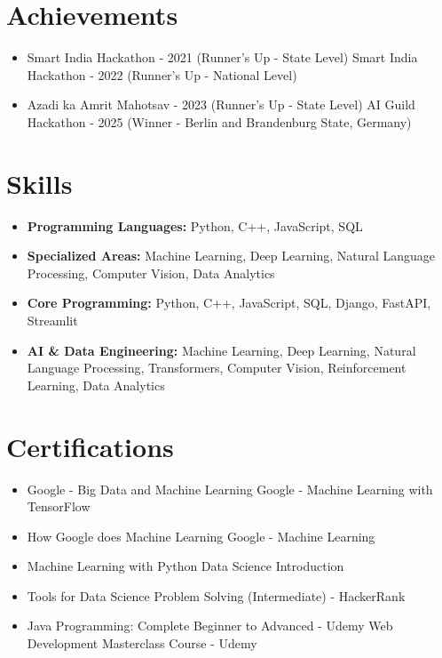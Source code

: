 \documentclass[a4paper,10pt]{article}
\begin{document}
\section*{Achievements}
\begin{itemize}
\item Smart India Hackathon - 2021 (Runner's Up - State Level) \hfill Smart India Hackathon - 2022 (Runner's Up - National Level)
\item Azadi ka Amrit Mahotsav - 2023 (Runner's Up - State Level) \hfill AI Guild Hackathon - 2025 (Winner - Berlin and Brandenburg State, Germany)
\end{itemize}

\section*{Skills}
\begin{itemize}
  \item \textbf{Programming Languages:} Python, C++, JavaScript, SQL
  \item \textbf{Specialized Areas:} Machine Learning, Deep Learning, Natural Language Processing, Computer Vision, Data Analytics
  \item \textbf{Core Programming:} Python, C++, JavaScript, SQL, Django, FastAPI, Streamlit
  \item \textbf{AI \& Data Engineering:} Machine Learning, Deep Learning, Natural Language Processing, Transformers, Computer Vision, Reinforcement Learning, Data Analytics
\end{itemize}

\section*{Certifications}
\begin{itemize}
\item Google - Big Data and Machine Learning \hfill Google - Machine Learning with TensorFlow
\item How Google does Machine Learning \hfill Google - Machine Learning
\item Machine Learning with Python \hfill Data Science Introduction
\item Tools for Data Science \hfill Problem Solving (Intermediate) - HackerRank
\item Java Programming: Complete Beginner to Advanced - Udemy \hfill Web Development Masterclass Course - Udemy
\end{itemize}
\end{document}
